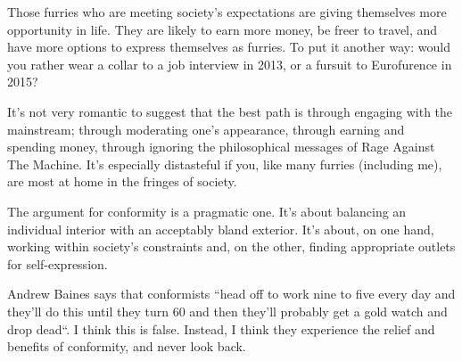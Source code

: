 Those furries who are meeting society's expectations are giving themselves more opportunity in life. They are likely to earn more money, be freer to travel, and have more options to express themselves as furries. To put it another way: would you rather wear a collar to a job interview in 2013, or a fursuit to Eurofurence in 2015?

It's not very romantic to suggest that the best path is through engaging with the mainstream; through moderating one's appearance, through earning and spending money, through ignoring the philosophical messages of Rage Against The Machine. It's especially distasteful if you, like many furries (including me), are most at home in the fringes of society.

The argument for conformity is a pragmatic one. It's about balancing an individual interior with an acceptably bland exterior. It's about, on one hand, working within society's constraints and, on the other, finding appropriate outlets for self-expression.

Andrew Baines says that conformists ``head off to work nine to five every day and they'll do this until they turn 60 and then they'll probably get a gold watch and drop dead``. I think this is false. Instead, I think they experience the relief and benefits of conformity, and never look back.
